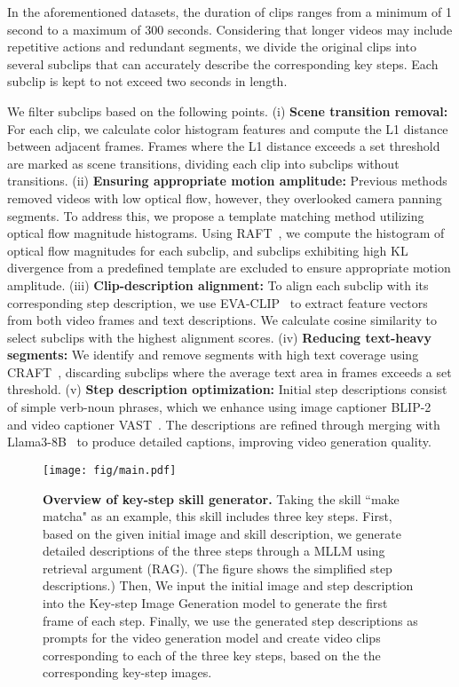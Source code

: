In the aforementioned datasets, the duration of clips ranges from a minimum of 1 second to a maximum of 300 seconds. Considering that longer videos may include repetitive actions and redundant segments, we divide the original clips into several subclips that can accurately describe the corresponding key steps. Each subclip is kept to not exceed two seconds in length.

We filter subclips based on the following points. (i) \textbf{Scene transition removal:} For each clip, we calculate color histogram features and compute the L1 distance between adjacent frames. Frames where the L1 distance exceeds a set threshold are marked as scene transitions, dividing each clip into subclips without transitions. (ii) \textbf{Ensuring appropriate motion amplitude:} Previous methods~\cite{SVD} removed videos with low optical flow, however, they overlooked camera panning segments. To address this, we propose a template matching method utilizing optical flow magnitude histograms. Using RAFT~\cite{raft}, we compute the histogram of optical flow magnitudes for each subclip, and subclips exhibiting high KL divergence from a predefined template are excluded to ensure appropriate motion amplitude. (iii) \textbf{Clip-description alignment:} To align each subclip with its corresponding step description, we use EVA-CLIP~\cite{evaclip} to extract feature vectors from both video frames and text descriptions. We calculate cosine similarity to select subclips with the highest alignment scores. (iv) \textbf{Reducing text-heavy segments:} We identify and remove segments with high text coverage using CRAFT~\cite{craft}, discarding subclips where the average text area in frames exceeds a set threshold. (v) \textbf{Step description optimization:} Initial step descriptions consist of simple verb-noun phrases, which we enhance using image captioner BLIP-2~\cite{blip2} and video captioner VAST~\cite{VAST}. The descriptions are refined through merging with Llama3-8B~\cite{llama} to produce detailed captions, improving video generation quality.




\begin{figure*}[t]
  \centering
   \texttt{[image: fig/main.pdf]}
   \caption{\textbf{Overview of key-step skill generator.} Taking the skill ``make matcha" as an example, this skill includes three key steps. First, based on the given initial image and skill description, we generate detailed descriptions of the three steps through a MLLM using retrieval argument (RAG). (The figure shows the simplified step descriptions.) Then, We input the initial image and step description into the Key-step Image Generation model to generate the first frame of each step. Finally, we use the generated step descriptions as prompts for the video generation model and create video clips corresponding to each of the three key steps, based on the the corresponding key-step images.}
   \label{fig:overview}
\end{figure*}


